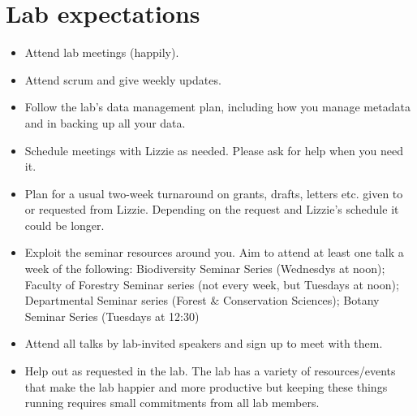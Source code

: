\documentclass[11pt,a4paper,oneside]{article}
\begin{document}
\section{Lab expectations}
\begin{itemize}
\item Attend lab meetings (happily). %
\item Attend scrum and give weekly updates. 
\item Follow the lab's data management plan, including how you manage metadata and in backing up all your data.
\item Schedule meetings with Lizzie as needed. Please ask for help when you need it.
\item Plan for a usual two-week turnaround on grants, drafts, letters etc. given to or requested from Lizzie. Depending on the request and Lizzie's schedule it could be longer.
\item Exploit the seminar resources around you. Aim to attend at least one talk a week of the following: Biodiversity Seminar Series (Wednesdys at noon); Faculty of Forestry Seminar series (not every week, but Tuesdays at noon); Departmental Seminar series (Forest \& Conservation Sciences); Botany Seminar Series (Tuesdays at 12:30)  %
\item Attend all talks by lab-invited speakers and sign up to meet with them. 
\item Help out as requested in the lab. The lab has a variety of resources/events that make the lab happier and more productive but keeping these things running requires small commitments from all lab members. 


\end{itemize}
\end{document}
